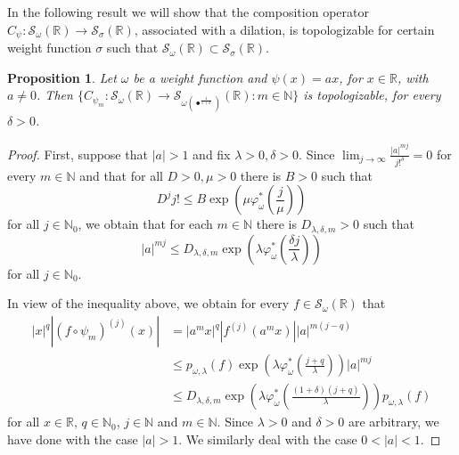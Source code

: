 \documentclass[12pt,reqno]{amsart} %
\newtheorem{prop}[theorem]{Proposition}
\numberwithin{equation}{section}
\begin{document}
				In the following result we will show that the composition operator $C_\psi: \mathcal{S}_{\omega}(\mathbb{R})\to \mathcal{S}_{\sigma}(\mathbb{R})$, associated with a dilation, is topologizable for   certain weight function $\sigma$  such that $\mathcal{S}_{\omega}(\mathbb{R})\subset \mathcal{S}_{\sigma}(\mathbb{R})$.
				\begin{prop}\label{dilationdelta} Let $\omega$ be a weight function and
					$\psi(x)=a x$, for $x\in\mathbb{R}$, with $a\not=0$. Then $\{C_{\psi_m}:\mathcal{S}_{\omega}(\mathbb{R})\to \mathcal{S}_{\omega(\bullet^{\frac{1}{1+\delta}})}(\mathbb{R}): m\in\mathbb{N}\}$ is topologizable, for every $\delta>0$.
				\end{prop}
				\begin{proof}
					First,  suppose  that $|a|>1$ and fix $\lambda>0, \delta>0$.
					Since $\lim_{j\to \infty}\frac{|a|^{m j}}{j!^\delta}=0$ for every $m\in\mathbb{N}$ and that for all $D>0, \mu>0$ there is $B>0$ such that \begin{equation*}
						D^j j! \leq B \exp\left(\mu \varphi^*_\omega\left(\frac{j}{\mu}\right)\right)
					\end{equation*} 
					for all $j\in\mathbb{N}_0$, we obtain that for each $m\in\mathbb{N}$ there is $D_{\lambda,\delta,m}>0$ such that
					\begin{equation*}
						|a|^{m j} \leq D_{\lambda,\delta,m} \exp\left(\lambda \varphi^*_\omega\left(\frac{\delta j}{\lambda}\right)\right)
					\end{equation*}
					for all $j\in \mathbb{N}_0$. 
					
					In view of the inequality above, we obtain for every $f\in \mathcal{S}_{\omega}(\mathbb{R})$ that
					\begin{equation*}
						\begin{split}
							|x|^q |(f\circ \psi_m)^{(j)}(x)| &=|a^m x|^q |f^{(j)}(a^m x)| |a|^{m(j-q)} \\& \leq 
							p_{\omega,\lambda}(f) \exp\left(\lambda \varphi^*_\omega\left(\frac{j+q}{\lambda}\right)\right) |a|^{mj} \\ &\leq D_{\lambda,\delta,m} \exp\left(\lambda \varphi^*_\omega\left(\frac{(1+\delta)(j+q)}{\lambda}\right)\right)p_{\omega,\lambda}(f)
						\end{split}
					\end{equation*} 
					for all $x\in\mathbb{R}$, $q\in\mathbb{N}_0$, $j\in\mathbb{N}$ and $m\in\mathbb{N}$. Since $\lambda>0$ and $\delta>0$ are arbitrary, we have done with the case $|a|>1$. We similarly deal with the case $0<|a|<1$. 
				\end{proof}
				
\end{document}
